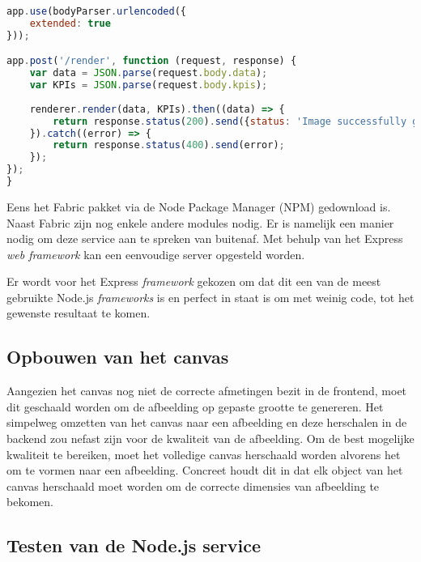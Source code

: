\begin{lstlisting}[caption={index.js - Node.js server},label=lst:ExpressIndexServer,language=javascript]
app.use(bodyParser.urlencoded({
	extended: true
}));

app.post('/render', function (request, response) {
	var data = JSON.parse(request.body.data);
	var KPIs = JSON.parse(request.body.kpis);
	
	renderer.render(data, KPIs).then((data) => {
		return response.status(200).send({status: 'Image successfully generated', image: 	data.toString('base64')});
	}).catch((error) => {
		return response.status(400).send(error);
	});
});
}
\end{lstlisting}




Eens het Fabric pakket via de Node Package Manager (NPM) gedownload is. Naast Fabric zijn nog enkele andere modules nodig. Er is namelijk een manier nodig om deze service aan te spreken van buitenaf. Met behulp van het Express \textit{web framework} kan een eenvoudige server opgesteld worden. 


Er wordt voor het Express \textit{framework} gekozen om dat dit een van de meest gebruikte Node.js \textit{frameworks} is en perfect in staat is om met weinig code, tot het gewenste resultaat te komen. 

\subsection{Opbouwen van het canvas}
Aangezien het canvas nog niet de correcte afmetingen bezit in de frontend, moet dit geschaald worden om de afbeelding op gepaste grootte te genereren. Het simpelweg omzetten van het canvas naar een afbeelding en deze herschalen in de backend zou nefast zijn voor de kwaliteit van de afbeelding. Om de best mogelijke kwaliteit te bereiken, moet het volledige canvas herschaald worden alvorens het om te vormen naar een afbeelding. Concreet houdt dit in dat elk object van het canvas herschaald moet worden om de correcte dimensies van afbeelding te bekomen. 

\subsection{Testen van de Node.js service}




